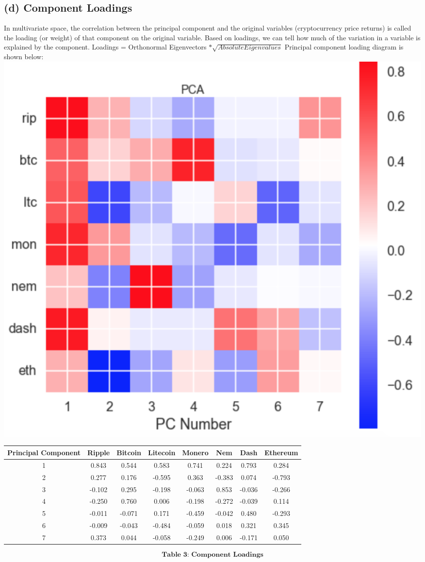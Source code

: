 \documentclass[12pt,twoside]{article}
\newcommand{\head}[1]{\textnormal{\textbf{#1}}}
\begin{document}
\subsection*{(d) Component Loadings}
\bigbreak
In multivariate space, the correlation between the principal component and the original variables (cryptocurrency price returns) is called the loading (or weight) of that component on the original variable. Based on loadings, we can tell how much of the variation in a variable is explained by the component.
\bigbreak
Loadings = Orthonormal Eigenvectors $* \sqrt{Absolute Eigen values}$
\bigbreak
Principal component loading diagram is shown below:
\bigbreak
\includegraphics[scale=.6]{pca_loadings.png}
\bigbreak
\begin{tabular}{cccccccc}
\hline
\head{Principal \newline Component} & \head{Ripple} & \head{Bitcoin} & \head{Litecoin} &\head{Monero} &\head{Nem} &\head{Dash} &\head{Ethereum}\\
\hline
1 & 0.843&0.544&0.583&0.741&0.224&0.793&0.284\\
2 & 0.277&0.176&-0.595&0.363&-0.383&0.074	&-0.793\\
3 & -0.102	&0.295&-0.198&-0.063&0.853&-0.036&-0.266\\
4 & -0.250&0.760&0.006&-0.198&-0.272&-0.039&0.114\\
5 & -0.011	&-0.071&0.171&-0.459&-0.042&0.480&-0.293\\
6 & -0.009&-0.043&-0.484&-0.059&0.018&0.321&0.345\\
7 & 0.373&0.044&-0.058&-0.249&0.006&-0.171&0.050\\
\hline
\end{tabular}
$$\textbf{Table 3: Component Loadings}$$
\end{document}
